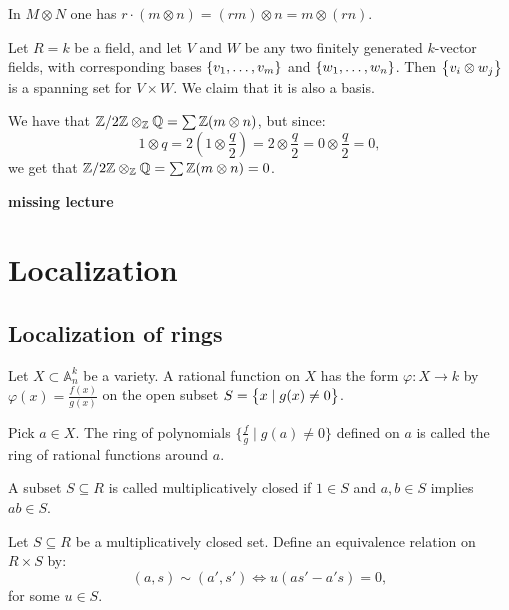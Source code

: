 \documentclass[11pt,a4paper]{article}
\newcommand{\A}{\mathbb A}
\begin{document}
\begin{remark}
  In $M \otimes N$ one has
  $r \cdot (m \otimes n) = (rm) \otimes n = m \otimes (rn)$.
\end{remark}

\begin{example}
  Let $R = k$ be a field,
  and let $V$ and $W$ be any two finitely generated $k$-vector fields,
  with corresponding bases $\left\{v_1,\dots,v_m\right\}$
  and $\left\{w_1,\dots,w_n\right\}$.
  Then $\left\{v_i \otimes w_j\right\}$ is a spanning set for $V \times W$.
  We claim that it is also a basis.
\end{example}

\begin{example}
  We have that $\mathbb{Z}/2\mathbb{Z} \otimes_{\mathbb{Z}} \mathbb{Q} = \sum \mathbb{Z}(m \otimes n)$,
  but since:
  \[
    1 \otimes q =
    2(1 \otimes \frac{q}{2}) =
    2 \otimes \frac{q}{2} =
    0 \otimes \frac{q}{2} = 0,
  \]
  we get that $\mathbb{Z}/2\mathbb{Z} \otimes_{\mathbb{Z}} \mathbb{Q} = \sum \mathbb{Z}(m \otimes n) = 0$.
\end{example}

\textbf{missing lecture}

\newpage

\section{Localization}
\subsection{Localization of rings}
\begin{definition}
  Let $X \subset \A_n^k$ be a variety.
  A rational function on $X$ has the form $\varphi \colon X \to k$
  by $\varphi(x) = \frac{f(x)}{g(x)}$ on the open subset
  $S = \left\{x \mid g(x) \neq 0\right\}$.
\end{definition}

\begin{definition}
  Pick $a \in X$.
  The ring of polynomials $\{\frac{f}{g} \mid g(a) \neq 0\}$
  defined on $a$ is called the ring of rational functions around $a$.
\end{definition}

\begin{definition}
  A subset $S \subseteq R$ is called multiplicatively closed if $1 \in S$
  and $a,b \in S$ implies $ab \in S$.
\end{definition}

\begin{definition}
  Let $S \subseteq R$ be a multiplicatively closed set.
  Define an equivalence relation on $R \times S$ by:
  \[
    (a,s) \sim (a',s') \iff
    u(as' - a's) = 0,
  \]
  for some $u \in S$.
\end{definition}
\end{document}
